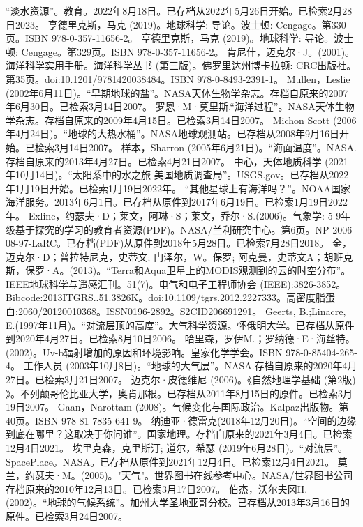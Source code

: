 \begin{enumerate}
 “淡水资源”。教育。2022年8月18日。已存档从2022年5月26日开始。已检索2月28日2023。
 亨德里克斯，马克 (2019)。地球科学: 导论。波士顿: Cengage。第330页。ISBN 978-0-357-11656-2。
 亨德里克斯，马克 (2019)。地球科学: 导论。波士顿: Cengage。第329页。ISBN 978-0-357-11656-2。
 肯尼什，迈克尔·J。(2001)。海洋科学实用手册。海洋科学丛书 (第三版)。佛罗里达州博卡拉顿: CRC出版社。第35页。doi:10.1201/9781420038484。ISBN 978-0-8493-2391-1。
 Mullen，Leslie (2002年6月11日)。“早期地球的盐”。NASA天体生物学杂志。存档自原来的2007年6月30日。已检索3月14日2007。
 罗恩·M·莫里斯.“海洋过程”。NASA天体生物学杂志。存档自原来的2009年4月15日。已检索3月14日2007。
 Michon Scott (2006年4月24日)。“地球的大热水桶”。NASA地球观测站。已存档从2008年9月16日开始。已检索3月14日2007。
 样本，Sharron (2005年6月21日)。“海面温度”。NASA.存档自原来的2013年4月27日。已检索4月21日2007。
 中心，天体地质科学 (2021年10月14日)。“太阳系中的水之旅-美国地质调查局”。USGS.gov。已存档从2022年1月19日开始。已检索1月19日2022年。
 “其他星球上有海洋吗？”。NOAA国家海洋服务。2013年6月1日。已存档从原件到2017年6月19日。已检索1月19日2022年。
 Exline，约瑟夫·D；莱文，阿琳·S；莱文，乔尔·S.(2006)。气象学: 5-9年级基于探究的学习的教育者资源(PDF)。NASA/兰利研究中心。第6页。NP-2006-08-97-LaRC。已存档(PDF)从原件到2018年5月28日。已检索7月28日2018。
 金，迈克尔·D；普拉特尼克，史蒂文; 门泽尔，W。保罗; 阿克曼，史蒂文A；胡班克斯，保罗·A。(2013)。“Terra和Aqua卫星上的MODIS观测到的云的时空分布”。IEEE地球科学与遥感汇刊。51(7)。电气和电子工程师协会 (IEEE):3826-3852。Bibcode:2013ITGRS..51.3826K。doi:10.1109/tgrs.2012.2227333。高密度脂蛋白:2060/20120010368。ISSN0196-2892。S2CID206691291。  
 Geerts, B.;Linacre, E.(1997年11月)。“对流层顶的高度”。大气科学资源。怀俄明大学。已存档从原件到2020年4月27日。已检索8月10日2006。
 哈里森，罗伊M.；罗纳德·E·海丝特。(2002)。Uv-b辐射增加的原因和环境影响。皇家化学学会。ISBN 978-0-85404-265-4。
 工作人员 (2003年10月8日)。“地球的大气层”。NASA.存档自原来的2020年4月27日。已检索3月21日2007。
 迈克尔·皮德维尼 (2006)。《自然地理学基础 (第2版) 》。不列颠哥伦比亚大学，奥肯那根。已存档从2011年8月15日的原件。已检索3月19日2007。
 Gaan，Narottam (2008)。气候变化与国际政治。Kalpaz出版物。第40页。ISBN 978-81-7835-641-9。
 纳迪亚·德雷克(2018年12月20日)。“空间的边缘到底在哪里？这取决于你问谁”。国家地理。存档自原来的2021年3月4日。已检索12月4日2021。
 埃里克森，克里斯汀; 道尔，希瑟 (2019年6月28日)。“对流层”。SpacePlace。NASA。已存档从原件到2021年12月4日。已检索12月4日2021。
 莫兰，约瑟夫·M。(2005)。"天气"。世界图书在线参考中心。NASA/世界图书公司存档原来的2010年12月13日。已检索3月17日2007。
 伯杰，沃尔夫冈H.(2002)。“地球的气候系统”。加州大学圣地亚哥分校。已存档从2013年3月16日的原件。已检索3月24日2007。

\end{enumerate}
